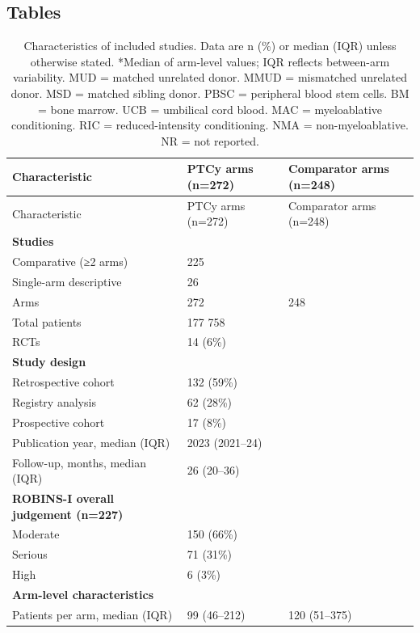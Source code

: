 \documentclass[
  british,
  8.6pt,
  a4paper,
  twocolumn]{article}
\begin{document}
\newpage{}

\onecolumn

\subsection{Tables}\label{tables}

\begin{longtable}[]{@{}lll@{}}
\caption{Characteristics of included studies. Data are n (\%) or median
(IQR) unless otherwise stated. *Median of arm-level values; IQR reflects
between-arm variability. MUD = matched unrelated donor. MMUD =
mismatched unrelated donor. MSD = matched sibling donor. PBSC =
peripheral blood stem cells. BM = bone marrow. UCB = umbilical cord
blood. MAC = myeloablative conditioning. RIC = reduced-intensity
conditioning. NMA = non-myeloablative. NR = not reported.
}\label{tbl-characteristics}\tabularnewline
\toprule\noalign{}
Characteristic & PTCy arms (n=272) & Comparator arms (n=248) \\
\midrule\noalign{}
\endfirsthead
\toprule\noalign{}
Characteristic & PTCy arms (n=272) & Comparator arms (n=248) \\
\midrule\noalign{}
\endhead
\bottomrule\noalign{}
\endlastfoot
\textbf{Studies} & & \\
Comparative (≥2 arms) & 225 & \\
Single-arm descriptive & 26 & \\
Arms & 272 & 248 \\
Total patients & 177 758 & \\
RCTs & 14 (6\%) & \\
\textbf{Study design} & & \\
Retrospective cohort & 132 (59\%) & \\
Registry analysis & 62 (28\%) & \\
Prospective cohort & 17 (8\%) & \\
Publication year, median (IQR) & 2023 (2021--24) & \\
Follow-up, months, median (IQR) & 26 (20--36) & \\
\textbf{ROBINS-I overall judgement (n=227)} & & \\
Moderate & 150 (66\%) & \\
Serious & 71 (31\%) & \\
High & 6 (3\%) & \\
\textbf{Arm-level characteristics} & & \\
Patients per arm, median (IQR) & 99 (46--212) & 120 (51--375) \\

\end{longtable}
\end{document}
